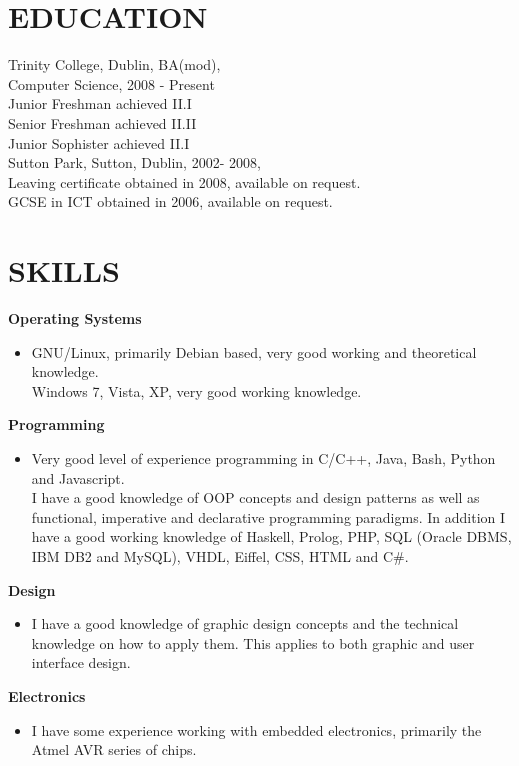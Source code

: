 \documentclass{res}
\begin{document}
\begin{resume}
 
   
 

\section{EDUCATION}
\vspace{0.1in} 
 
    Trinity College, Dublin, BA(mod),\\ 
    Computer Science, 2008 - Present\\
    Junior Freshman achieved II.I\\
    Senior Freshman achieved II.II\\
    Junior Sophister achieved II.I \\
 
    Sutton Park, Sutton, Dublin, 2002- 2008,\\
    Leaving certificate obtained in 2008, available on request.\\
    GCSE in ICT obtained in 2006, available on request.\\
    
     
\section{SKILLS} 
\vspace{0.1in}
 {\bf Operating Systems}
    \begin{itemize} %
      \item[] GNU/Linux, primarily Debian based, very good working and theoretical knowledge.\\
        Windows 7, Vista, XP, very good working knowledge.
      \end{itemize}
{\bf Programming} 
       \begin{itemize}
        \item[] Very good level of experience programming in C/C++, Java, Bash, Python and Javascript.\\
        I have a good knowledge of OOP concepts and design patterns as well as functional, imperative and declarative programming paradigms.  
        In addition I have a good working knowledge of Haskell, Prolog, PHP, SQL (Oracle DBMS, IBM DB2 and MySQL), VHDL, Eiffel, CSS, HTML and C\#.
    \end{itemize}

  {\bf Design} 
        \begin{itemize}
        \item[] I have a good knowledge of graphic design concepts and the technical knowledge on how to apply them. This applies to both graphic and user interface design.
       \end{itemize}

   {\bf  Electronics} 
        \begin{itemize}
        \item[]  I have some experience working with embedded electronics, primarily the Atmel AVR series of chips.
       \end{itemize} 

 

 

\end{resume}
\end{document}
